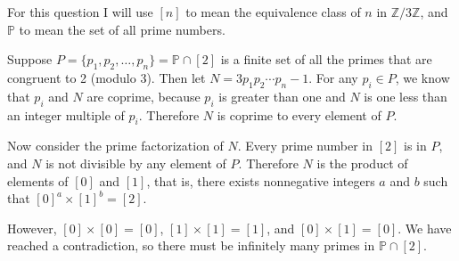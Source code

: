 \documentclass[12pt]{article}
\begin{document}
\bigskip
\noindent{}\bigskip

For this question I will use $[n]$ to mean the equivalence class of $n$ in $\mathbb{Z}/3\mathbb{Z}$, and $\mathbb{P}$ to mean the set of all prime numbers.
\par
Suppose $P = \{ p_1, p_2, \dots, p_n \} = \mathbb{P} \cap [2]$ is a finite set of all the primes that are congruent to 2 (modulo 3). Then let $N = 3 p_1 p_2 \cdots p_n - 1$. For any $p_i \in P$, we know that $p_i$ and $N$ are coprime, because $p_i$ is greater than one and $N$ is one less than an integer multiple of $p_i$. Therefore $N$ is coprime to every element of $P$.
\par
Now consider the prime factorization of $N$. Every prime number in $[2]$ is in $P$, and $N$ is not divisible by any element of $P$. Therefore $N$ is the product of elements of $[0]$ and $[1]$, that is, there exists nonnegative integers $a$ and $b$ such that $[0]^a \times [1]^b = [2]$.
\par
However, $[0] \times [0] = [0]$, $[1] \times [1] = [1]$, and $[0] \times [1] = [0]$. We have reached a contradiction, so there must be infinitely many primes in $\mathbb{P} \cap [2]$.
\end{document}
